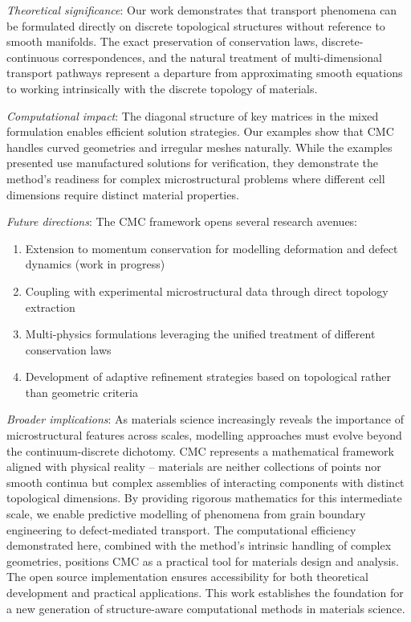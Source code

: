 \documentclass{elsarticle}
\theoremstyle{definition}
\begin{document}
\textit{Theoretical significance}: Our work demonstrates that transport phenomena can be formulated directly on discrete topological structures without reference to smooth manifolds. The exact preservation of conservation laws, discrete-continuous correspondences, and the natural treatment of multi-dimensional transport pathways represent a departure from approximating smooth equations to working intrinsically with the discrete topology of materials.

\textit{Computational impact}: The diagonal structure of key matrices in the mixed formulation enables efficient solution strategies. Our examples show that CMC handles curved geometries and irregular meshes naturally. While the examples presented use manufactured solutions for verification, they demonstrate the method's readiness for complex microstructural problems where different cell dimensions require distinct material properties.

\textit{Future directions}: The CMC framework opens several research avenues:
\begin{enumerate}
    \item Extension to momentum conservation for modelling deformation and defect dynamics (work in progress)
    \item Coupling with experimental microstructural data through direct topology extraction
    \item Multi-physics formulations leveraging the unified treatment of different conservation laws
    \item Development of adaptive refinement strategies based on topological rather than geometric criteria
\end{enumerate}

\textit{Broader implications}: As materials science increasingly reveals the importance of microstructural features across scales, modelling approaches must evolve beyond the continuum-discrete dichotomy. CMC represents a mathematical framework aligned with physical reality -- materials are neither collections of points nor smooth continua but complex assemblies of interacting components with distinct topological dimensions. By providing rigorous mathematics for this intermediate scale, we enable predictive modelling of phenomena from grain boundary engineering to defect-mediated transport.
The computational efficiency demonstrated here, combined with the method's intrinsic handling of complex geometries, positions CMC as a practical tool for materials design and analysis. The open source implementation ensures accessibility for both theoretical development and practical applications. This work establishes the foundation for a new generation of structure-aware computational methods in materials science.
\end{document}
